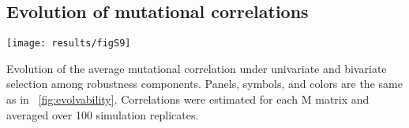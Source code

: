 \documentclass[10pt,a4paper]{article}
\newcommand{\M}{\bm{\mathrm M}}
\begin{document}
\begin{appendices}
    \subsection*{Evolution of mutational correlations}
	\begin{adjustwidth}{-1in}{0in}
	\texttt{[image: results/figS9]} 
	
	{\color{Gray} Evolution of the average mutational correlation under univariate and bivariate selection among robustness components. Panels, symbols, and colors are the same as in ~\ref{fig:evolvability}. Correlations were estimated for each $\M$ matrix and averaged over 100 simulation replicates. }
	\end{adjustwidth}
	
\end{appendices}
\end{document}
